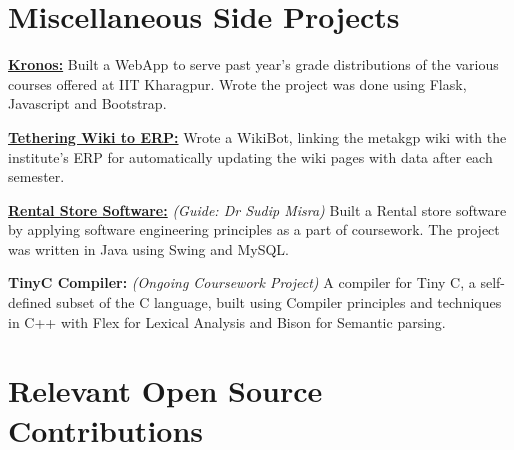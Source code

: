 \documentclass[a4paper,10pt]{extarticle} %
\begin{document}
\vspace{-0.3cm}
\section{\textcolor{primary}{Miscellaneous Side Projects}}

\textbf{\href{https://github.com/metakgp/kronos}{Kronos:}} Built a WebApp to serve past year's grade distributions of the various courses offered at IIT Kharagpur. Wrote the project was done using Flask, Javascript and Bootstrap. 

\textbf{\href{https://github.com/metakgp/twerp}{Tethering Wiki to ERP:}} Wrote a WikiBot, linking the metakgp wiki with the institute's ERP for automatically updating the wiki pages with data after each semester.

\textbf{\href{https://github.com/Ayushk4/Rental-Store-Software}{Rental Store Software:}} \textit{(Guide: Dr Sudip Misra)}
Built a Rental store software by applying software engineering principles as a part of coursework. The project was written in Java using Swing and MySQL.

\textbf{TinyC Compiler:}
\textit{(Ongoing Coursework Project)}
A compiler for Tiny C, a self-defined subset of the C language, built using Compiler principles and techniques in C++ with Flex for Lexical Analysis and Bison for Semantic parsing. \\

\vspace{-0.3cm}
\section{\textcolor{primary}{Relevant Open Source Contributions}}
\end{document}
